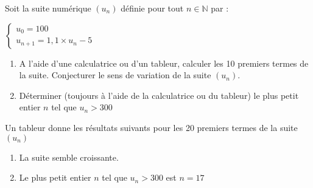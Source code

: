 
%
Soit la suite numérique $\left(u_{n}\right)$ définie pour tout $n \in  \mathbb{N}$ par :
\par
$\left\{ \begin{matrix} u_{0}=100 \\ u_{n+1} =1,1\times u_{n}-5\end{matrix}\right.$
     \begin{enumerate}
          \item
          A l'aide d'une calculatrice ou d'un tableur, calculer les 10 premiers termes de la suite. Conjecturer le sens de variation de la suite $\left(u_{n}\right)$.
          \item
          Déterminer (toujours à l'aide de la calculatrice ou du tableur) le plus petit entier $n$ tel que $u_{n} > 300$
     \end{enumerate}
     \begin{corrige}
          Un tableur donne les résultats suivants pour les 20 premiers termes de la suite $\left(u_{n}\right)$

\begin{center}
\end{center}
          \begin{enumerate}
               \item
               La suite semble croissante.
               \item
               Le plus petit entier $n$ tel que $u_{n} > 300$ est $n=17$
          \end{enumerate}
\end{corrige}
